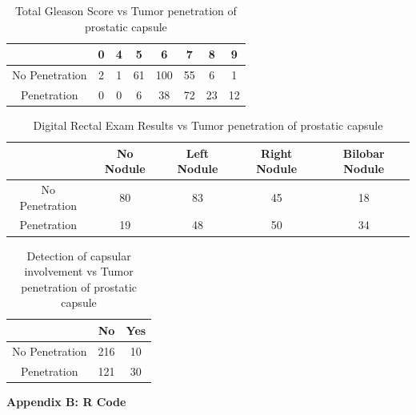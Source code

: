 \documentclass{article}\usepackage[]{graphicx}\usepackage[]{color}
\begin{document}
\begin{table}
\begin{center}
\caption{Total Gleason Score vs Tumor penetration of prostatic capsule}
\label{gleason}
\begin{tabular}{c|c|c|c|c|c|c|c}
   &0 &  4 &  5  & 6 &  7 &  8  & 9 \\ \hline
      No Penetration &  2 &  1 & 61 & 100 & 55 &  6  & 1 \\
      Penetration &  0  & 0 &  6 & 38 & 72 & 23 & 12 \\
\end{tabular}
\end{center}
\end{table}


\begin{table}
\begin{center}
\caption{Digital Rectal Exam Results vs Tumor penetration of prostatic capsule}
\label{race}
\begin{tabular}{c|c|c|c|c}
 & No Nodule & Left Nodule & Right Nodule  & Bilobar Nodule \\ \hline
      No Penetration & 80 & 83 & 45 & 18 \\
      Penetration & 19 & 48 & 50 & 34\\
\end{tabular}
\end{center}
\end{table}

\begin{table}
\begin{center}
\caption{Detection of capsular involvement vs Tumor penetration of prostatic capsule}
\label{dcaps}
\begin{tabular}{c|c|c}
 & No & Yes \\ \hline
No Penetration & 216 & 10\\
Penetration & 121 & 30 \\
\end{tabular}
\end{center}
\end{table}
\newpage
\noindent \Large{{\bf Appendix B: R Code}}



\end{document}
